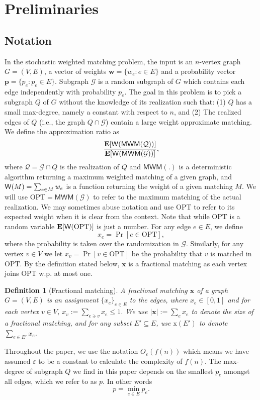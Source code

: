 \documentclass[letterpaper,11pt]{article}
\renewcommand{\epsilon}{\varepsilon}
\DeclareMathOperator{\E}{\ensuremath{\normalfont \textbf{E}}}
\newcommand{\mc}[1]{\ensuremath{\mathcal{#1}}}
\newcommand{\opt}[0]{\text{OPT}}
\newcommand{\MM}[0]{{\textsf{MWM}}}
\newcommand{\weight}[0]{{\sf{W}}}
\renewcommand{\b}[1]{\ensuremath{\bm{\mathrm{#1}}}}
\renewcommand{\epsilon}[0]{\ensuremath{\varepsilon}}
\let\originalleft\left
\let\originalright\right
\renewcommand{\left}{\mathopen{}\mathclose\bgroup\originalleft}
\renewcommand{\right}{\aftergroup\egroup\originalright}
\newtheorem{definition}[lemma]{Definition}
\renewcommand{\mc}[1]{\ensuremath{\mathcal{#1}}}
\begin{document}
 \section{Preliminaries}
\subsection{Notation}
In the stochastic weighted matching  problem, the input is an $n$-vertex graph $G=(V,E)$, a vector of weights $\bm{w}=\{w_e: e\in E\}$ and a probability  vector $\bm{p}=\{p_e: p_e \in E\}$.  Subgraph $\mc{G}$ is a  random  subgraph of $G$ which contains each edge independently with probability $p_e$. The goal in this problem is to pick a subgraph $Q$ of $G$ without the knowledge of its realization  such that: (1) $Q$ has a small max-degree, namely a constant with respect to $n$, and (2) The realized edges of $Q$ (i.e., the graph $Q \cap \mc{G}$) contain a large weight approximate matching.
We define the approximation ratio as 
 $$\frac{\E\left[\weight\left (\MM(\mc{Q})\right)\right]}{\E[\weight(\MM(\mc{G}))]},$$
where $\mc{Q} = \mc{G}\cap Q$ is the realization of $Q$ and $\MM(.)$ is a deterministic algorithm returning a maximum weighted matching of a given graph, and $\weight(M) = \sum_{e\in M} w_e$ is a function returning the weight of a given matching $M$. We will use $\opt=\MM(\mc{G})$ to refer to  the maximum matching of the actual realization.  We may sometimes abuse notation and use $\opt$ to refer to its expected weight when it is clear from the context. Note that while $\opt$ is a random variable $\E[\weight(\opt)]$ is just a number. For any edge $e\in E$, we define $$x_e=\Pr[e\in \opt],$$ where the probability is taken over the randomization in $\mc{G}$. Similarly, for any vertex $v\in V$ we let $x_v=\Pr[v\in \opt]$ be the probability that $v$ is matched in $\opt$. By the definition stated below, $\bm{x}$ is a fractional matching as each vertex joins $\opt$ w.p. at most one. 


\begin{definition}[Fractional matching]\label{def:frac-matching}
A \emph{fractional matching} $\bm{x}$ of a graph $G=(V, E)$ is an assignment $\{x_e\}_{e \in E}$ to the edges, where $x_e \in [0, 1]$ and for each vertex $v \in V$, $x_v := \sum_{e \ni v} x_e \leq 1$. We use $|\bm{x}| := \sum_e x_e$ to denote the size of a fractional matching, and for any subset $E' \subseteq E$, use $\b{x}(E')$ to denote $\sum_{e \in E'} x_e$. 
\end{definition}
Throughout the paper, we use the notation  $O_\epsilon(f(n))$ which means we have assumed $\epsilon$ to be a constant to calculate the complexity of $f(n)$. The max-degree of subgraph $Q$ we find in this paper depends on the smallest $p_e$ amongst all edges, which we refer to as $p$. In other words 
$$p=\min_{e\in E} p_e.$$
\end{document}
